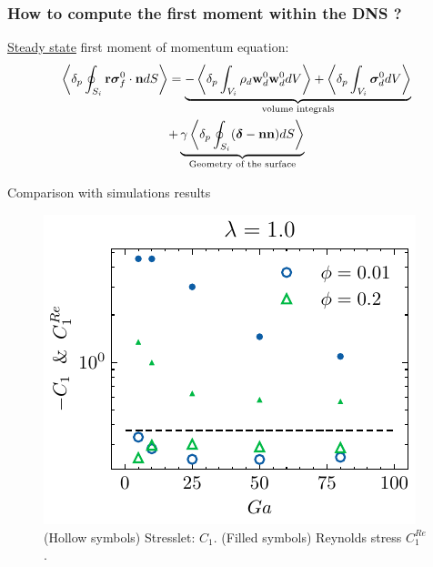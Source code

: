 \documentclass{sintefbeamer}
\begin{document}
\begin{frame}
  \frametitle{How to compute the first moment within the DNS ?}

  \underline{Steady state} first moment of momentum equation:
  \begin{multline*}
    \pSavg[i]{\textbf{r}\bm\sigma_f^0\cdot \textbf{n}}
    = 
    \underbrace{- \pOavg[i]{\rho_d \textbf{w}_d^0  \textbf{w}_d^0 }
    + \pOavg[i]{\bm\sigma_d^0}}_\text{volume integrals}\\
    +  \underbrace{\gamma \pSavg[i]{(\bm\delta - \textbf{nn})}}_\text{Geometry of the surface}
\end{multline*}

\end{frame}

\begin{frame}{Comparison with simulations results}
  \begin{figure}[h!]
    \centering
    \includegraphics[height = 0.25\textwidth]{image/HOMOGENEOUS_final/PA/Sdev_diapo_l_10.pdf}
    \caption{
      (Hollow symbols) Stresslet: $C_1$. 
      (Filled symbols) Reynolds stress $C_1^{Re}$. 
     }
\end{figure}



\end{frame}
\end{document}
